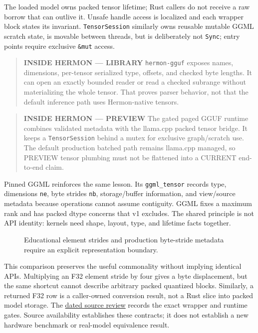 \documentclass[
  10pt,
]{article}
\begin{document}
The loaded model owns packed tensor lifetime; Rust callers do not
receive a raw borrow that can outlive it. Unsafe handle access is
localized and each wrapper block states its invariant.
\texttt{TensorSession} similarly owns reusable mutable GGML scratch
state, is movable between threads, but is deliberately not
\texttt{Sync}; entry points require exclusive \texttt{\&mut} access.

\begin{quote}
\textbf{INSIDE HERMON --- LIBRARY} \texttt{hermon-gguf} exposes names,
dimensions, per-tensor serialized type, offsets, and checked byte
lengths. It can open an exactly bounded reader or read a checked
subrange without materializing the whole tensor. That proves parser
behavior, not that the default inference path uses Hermon-native
tensors.
\end{quote}

\begin{quote}
\textbf{INSIDE HERMON --- PREVIEW} The gated paged GGUF runtime combines
validated metadata with the llama.cpp packed tensor bridge. It keeps a
\texttt{TensorSession} behind a mutex for exclusive graph/scratch use.
The default production batched path remains llama.cpp managed, so
PREVIEW tensor plumbing must not be flattened into a CURRENT end-to-end
claim.
\end{quote}

Pinned GGML reinforces the same lesson. Its \texttt{ggml\_tensor}
records type, dimensions \texttt{ne}, byte strides \texttt{nb},
storage/buffer information, and view/source metadata because operations
cannot assume contiguity. GGML fixes a maximum rank and has packed dtype
concerns that v1 excludes. The shared principle is not API identity:
kernels need shape, layout, type, and lifetime facts together.

\begin{figure}[H]\centering\resizebox{\linewidth}{!}{}\caption{Educational element strides and production byte-stride metadata require an explicit representation boundary.}\end{figure}

This comparison preserves the useful commonality without implying
identical APIs. Multiplying an F32 element stride by four gives a byte
displacement, but the same shortcut cannot describe arbitrary packed
quantized blocks. Similarly, a returned F32 row is a caller-owned
conversion result, not a Rust slice into packed model storage. The
\href{https://github.com/hermonai/inside-the-llm-engine/blob/astra-visual-rewrite/research/astra/chapter05-regeneration.md}{dated
source review} records the exact wrapper and runtime gates. Source
availability establishes these contracts; it does not establish a new
hardware benchmark or real-model equivalence result.
\end{document}
